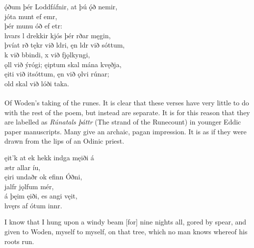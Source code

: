 \bva {}ǫ́ðum þér Loddfáfnir, \hld at þú ǫ́ð nemir, \\%
\ind {}jóta munt ef emr, \\%
\ind þér munu óð ef etr: \\%
hvars l drekkir \hld kjós þér rðar męgin, \\%
þvíat rð tękr við ldri, \hld ęn ldr við sóttum, \\%
k við bbindi, \hld {}x við fjǫlkyngi, \\%
ǫll við ýrógi; \hld {}ęiptum skal mána kvęðja, \\%
ęiti við itsóttum, \hld ęn við ǫlvi rúnar; \\%
\ind {}old skal við lóði taka.\\%

 \\

Of Woden's taking of the runes.
It is clear that these verses have very little to do with the rest of the poem, but instead are separate. It is for this reason that they are labelled as \emph{Rúnatals þáttr} (The strand of the Runecount) in younger Eddic paper manuscripts. Many give an archaic, pagan impression. It is as if they were drawn from the lips of an Odinic priest.

\bva \footnotemark[2] ęit'k at ek hekk \hld {}indga męiði á \\%
\ind {}ætr allar íu, \\%
ęiri undaðr \hld ok efinn Óðni, \\%
\ind {}jalfr jǫlfum mér, \\%
á þęim ęiði, \hld es angi vęit, \\%
\ind hvęrs af ótum innr\footnotemark[3].\\%

\bvb I know that I hung upon a windy beam [for] nine nights all, gored by spear, and given to Woden, myself to myself, on that tree, which no man knows whereof his roots run. \\

